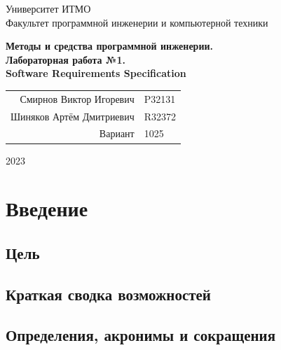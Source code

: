 \documentclass{article}
\begin{document}
\begin{titlepage}
  \begin{center}
    \begin{spacing}{1.4}
      \large{Университет ИТМО} \\
      \large{Факультет программной инженерии и компьютерной техники} \\
    \end{spacing}
    \vfill
    \textbf{
      \huge{Методы и средства программной инженерии.} \\
      \huge{Лабораторная работа №1.} \\
      \huge{Software Requirements Specification} \\
    }
  \end{center}
  \vfill
  \begin{center}
    \begin{tabular}{r l}
      Смирнов Виктор Игоревич  & P32131 \\
      Шиняков Артём Дмитриевич & R32372 \\
      Вариант                  & 1025   \\
    \end{tabular}
  \end{center}
  \vfill
  \begin{center}
    \begin{large}
      2023
    \end{large}
  \end{center}
\end{titlepage}

\tableofcontents

\section{Введение}

\subsection{Цель}


\subsection{Краткая сводка возможностей}


\subsection{Определения, акронимы и сокращения}

\end{document}
